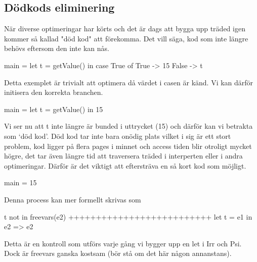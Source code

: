 \documentclass[../Optimise]{subfiles}
\begin{document}
\subsection{Dödkods eliminering}

När diverse optimeringar har körts och det är dags att bygga upp träded igen kommer
så kallad "död kod" att förekomma. Det vill säga, kod som inte längre behövs eftersom
den inte kan nås.

\begin{codeEx}
main = let t = getValue() in
            case True of
               True  -> 15
               False -> t
\end{codeEx}

Detta exemplet är trivialt att optimera då värdet i casen är känd. Vi kan därför
initisera den korrekta branchen.


\begin{codeEx}
main = let t = getValue() in 15
\end{codeEx}


Vi ser nu att t inte längre är bunded i uttrycket (15) och därför kan vi
 betrakta  som `död kod'. Död kod tar inte bara onödig plats
 vilket i sig är ett stort problem, kod ligger på flera pages i minnet och
 access tiden blir otroligt mycket högre, det tar även längre tid att traversera
 träded i interperten eller i andra optimeringar. Därför är det viktigt att
 eftersträva en så kort kod som möjligt.

\begin{codeEx}
main = 15
\end{codeEx}

Denna process kan mer formellt skrivas som

\begin{codeEx}
t not in freevars(e2)
++++++++++++++++++++++++++
let t = e1 in e2 => e2
\end{codeEx}

Detta är en kontroll som utförs varje gång vi bygger upp en let i Irr och Psi.
Dock är freevars ganska kostsam (bör stå om det här någon annanstans).
\end{document}
